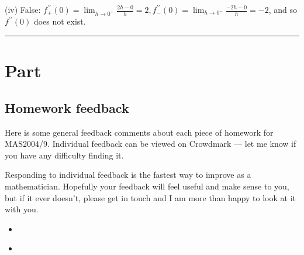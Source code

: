 \documentclass[letterpaper,10pt,english]{jupyterBook}
\begin{document}
\sphinxAtStartPar
(iv) False:  \(f^{\prime \prime}_{+}(0) = \lim_{h \rightarrow 0^+}\frac{2h - 0}{h} = 2, f^{\prime \prime}_{-}(0) = \lim_{h \rightarrow 0^-}\frac{-2h - 0}{h} = -2\), and so \(f^{\prime \prime}(0)\) does not exist.


\bigskip\hrule\bigskip


\sphinxstepscope


\part{Part}

\sphinxstepscope


\chapter{Homework feedback}
\label{\detokenize{HW-feedback:homework-feedback}}\label{\detokenize{HW-feedback:hw-feedback}}\label{\detokenize{HW-feedback::doc}}
\sphinxAtStartPar
Here is some general feedback comments about each piece of homework for MAS2004/9. Individual feedback can be viewed on Crowdmark — let me know if you have any difficulty finding it.

\sphinxAtStartPar
Responding to individual feedback is the fastest way to improve as a mathematician. Hopefully your feedback will feel useful and make sense to you, but if it ever doesn’t, please get in touch and I am more than happy to look at it with you.

\begin{sphinxShadowBox}
\begin{itemize}
\item {} 
\sphinxAtStartPar
{}\label{\detokenize{HW-feedback:id1}}{\hyperref[\detokenize{HW-feedback:feedback-for-homework-2}]{}}

\item {} 
\sphinxAtStartPar
{}\label{\detokenize{HW-feedback:id2}}{\hyperref[\detokenize{HW-feedback:feedback-for-homework-1}]{}}

\end{itemize}
\end{sphinxShadowBox}
\end{document}
